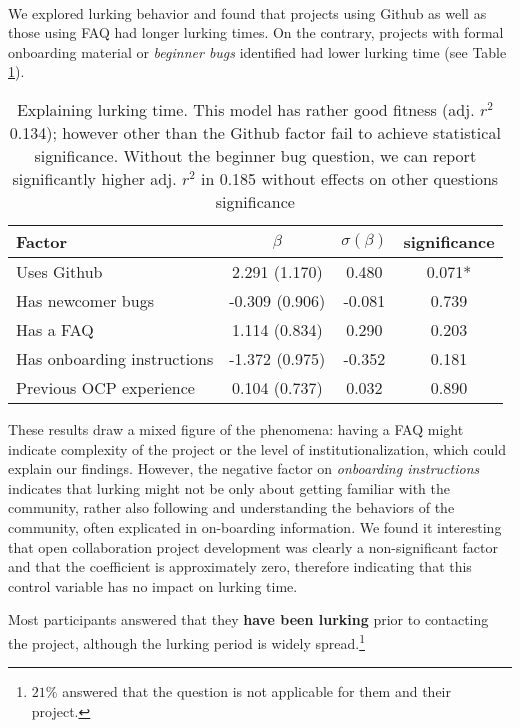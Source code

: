 \\
We explored lurking behavior and found that projects using Github as well as those using FAQ had longer lurking times. On the contrary, projects with formal onboarding material or {\it beginner bugs} identified had lower lurking time (see Table \ref{tab:lurking_time_regression}).

\begin{table}
\centering
\begin{tabular}{lccc}
Factor & $\beta$ & $\sigma(\beta)$ & significance \\
\hline 
Uses Github & 2.291 (1.170) & 0.480 & 0.071* \\ 
Has newcomer bugs & -0.309 (0.906) & -0.081 & 0.739 \\ 
Has a FAQ & 1.114 (0.834) & 0.290 & 0.203 \\ 
Has onboarding instructions & -1.372 (0.975) & -0.352 & 0.181 \\
\hline
Previous OCP experience & 0.104 (0.737) & 0.032 & 0.890 \\ 
\hline 
\end{tabular} 
\caption{Explaining lurking time. This model has rather good fitness (adj. $r^2$ 0.134); however other than the Github factor fail to achieve statistical significance. Without the beginner bug question, we can report significantly higher adj. $r^2$ in 0.185 without effects on other questions significance}
\label{tab:lurking_time_regression}
\end{table}

These results draw a mixed figure of the phenomena: having a FAQ might indicate complexity of the project or the level of institutionalization, which could explain our findings. However, the negative factor on {\it onboarding instructions} indicates that lurking might not be only about getting familiar with the community, rather also following and understanding the behaviors of the community, often explicated in on-boarding information.  We found it interesting that open collaboration project development was clearly a non-significant factor and that the coefficient is approximately zero, therefore indicating that this control variable has no impact on lurking time.

Most participants answered that they {\bf have been lurking} prior to contacting the project, although the lurking period is widely spread.\footnote{$21\%$ answered that the question is not applicable for them and their project.}  


